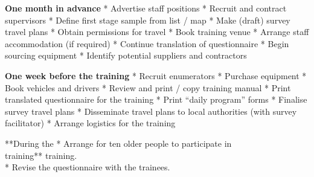 \documentclass[12pt,a4paper]{book}
\theoremstyle{definition}
\theoremstyle{definition}
\theoremstyle{definition}
\theoremstyle{remark}
\begin{document}
\textbf{One month in advance} * Advertise staff positions * Recruit and
contract supervisors * Define first stage sample from list / map * Make
(draft) survey travel plans * Obtain permissions for travel * Book
training venue * Arrange staff accommodation (if required) * Continue
translation of questionnaire * Begin sourcing equipment * Identify
potential suppliers and contractors

\textbf{One week before the training} * Recruit enumerators * Purchase
equipment * Book vehicles and drivers * Review and print / copy training
manual * Print translated questionnaire for the training * Print ``daily
program'' forms * Finalise survey travel plans * Disseminate travel
plans to local authorities (with survey facilitator) * Arrange logistics
for the training

**During the \textbar{} * Arrange for ten older people to participate in
\textbar{}\\
training** \textbar{} training. \textbar{}\\
\hspace*{0.333em}\hspace*{0.333em}\hspace*{0.333em}\hspace*{0.333em}\hspace*{0.333em}\hspace*{0.333em}\hspace*{0.333em}\hspace*{0.333em}\hspace*{0.333em}\hspace*{0.333em}\hspace*{0.333em}\hspace*{0.333em}\hspace*{0.333em}\hspace*{0.333em}\hspace*{0.333em}\hspace*{0.333em}\hspace*{0.333em}\hspace*{0.333em}\hspace*{0.333em}\hspace*{0.333em}\hspace*{0.333em}\hspace*{0.333em}\hspace*{0.333em}\textbar{}
* Revise the questionnaire with the trainees. \textbar{}\\
\end{document}
